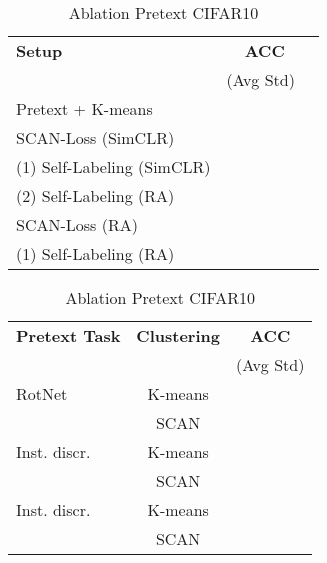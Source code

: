\documentclass[runningheads]{llncs}
\begin{document}
\setlength{\tabcolsep}{4pt}
\begin{table}[t]
\begin{minipage}[t]{0.5\linewidth}
\scriptsize
\begin{center}
\caption{Ablation Method CIFAR10}
\label{table:ablation_method}
\begin{tabular}{lcc}
\toprule
\textbf{Setup} & \ \textbf{ACC} \\
 &  (Avg  Std) \\
\midrule
Pretext + K-means &  \\
SCAN-Loss (SimCLR) &  \\
\hspace{0.1in} (1) Self-Labeling (SimCLR) &  \\
\hspace{0.1in} (2) Self-Labeling (RA) &  \\
SCAN-Loss (RA) &  \\
\hspace{0.1in} (1) Self-Labeling (RA) &  \\
\bottomrule
\end{tabular}
\end{center}
\end{minipage}
\hspace*{\fill}
\begin{minipage}[t]{0.5\linewidth}
\scriptsize
\begin{center}
\caption{Ablation Pretext CIFAR10}
\label{table: ablation_pretext}
\begin{tabular}{lcc}
\toprule
\textbf{Pretext Task} & \textbf{Clustering}& \textbf{ACC}\\
  & & (Avg  Std)  \\
\midrule
RotNet~\cite{RotNet}  & K-means &  \\
  & SCAN &  \\
Inst. discr.~\cite{wu2018unsupervised} & K-means & \\
 & SCAN &  \\
Inst. discr.~\cite{chen2020simple} & K-means &  \\
 & SCAN &  \\
\bottomrule
\end{tabular}
\end{center}
\end{minipage}
\end{table}
\setlength{\tabcolsep}{1.4pt}
\end{document}
